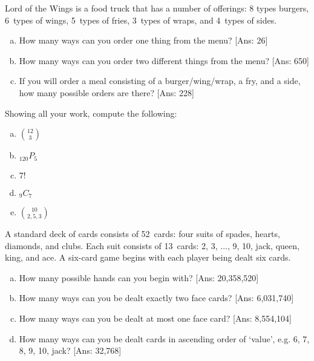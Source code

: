 \documentclass[11pt,letterpaper]{article}
\begin{document}

 Lord of the Wings is a food truck that has a number of offerings: 8 types burgers, 6~types of wings, 5~types of fries, 3~types of wraps, and 4~types of sides. 
	\begin{enumerate}[(a)]
	\item How many ways can you order one thing from the menu? [Ans: 26]
	\item How many ways can you order two different things from the menu? [Ans: 650]
	\item If you will order a meal consisting of a burger/wing/wrap, a fry, and a side, how many possible orders are there? [Ans: 228]
	\end{enumerate}



\newpage



 Showing all your work, compute the following:
	\begin{enumerate}[(a)]
	\item $\binom{12}{3}$
	\item $_{120} P_5$
	\item $7!$
	\item $_{9} C_{7}$
	\item $\binom{10}{2,5,3}$
	\end{enumerate}



\newpage



 A standard deck of cards consists of 52~cards: four suits of spades, hearts, diamonds, and clubs. Each suit consists of 13~cards: 2, 3, $\ldots$, 9, 10, jack, queen, king, and ace. A six-card game begins with each player being dealt six cards. 
	\begin{enumerate}[(a)]
	\item How many possible hands can you begin with? [Ans: 20,358,520]
	\item How many ways can you be dealt exactly two face cards? [Ans: 6,031,740]
	\item How many ways can you be dealt at most one face card? [Ans: 8,554,104]
	\item How many ways can you be dealt cards in ascending order of `value', e.g. 6, 7, 8, 9, 10, jack? [Ans: 32,768]
	\end{enumerate}
\end{document}
